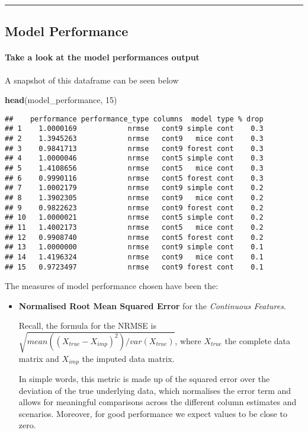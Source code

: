 \documentclass[]{article}
\newenvironment{Shaded}{\begin{snugshade}}{\end{snugshade}}
\newcommand{\DecValTok}[1]{\textcolor[rgb]{0.00,0.00,0.81}{#1}}
\newcommand{\KeywordTok}[1]{\textcolor[rgb]{0.13,0.29,0.53}{\textbf{#1}}}
\newcommand{\NormalTok}[1]{#1}
\let\oldparagraph\paragraph
\renewcommand{\paragraph}[1]{\oldparagraph{#1}\mbox{}}
\begin{document}
\begin{center}\rule{0.5\linewidth}{0.5pt}\end{center}

\hypertarget{model-performance}{%
\subsection{Model Performance}\label{model-performance}}

\hypertarget{take-a-look-at-the-model-performances-output}{%
\paragraph{Take a look at the model performances
output}\label{take-a-look-at-the-model-performances-output}}

A snapshot of this dataframe can be seen below

\begin{Shaded}
\begin{Highlighting}[]
\KeywordTok{head}\NormalTok{(model_performance, }\DecValTok{15}\NormalTok{)}
\end{Highlighting}
\end{Shaded}

\begin{verbatim}
##    performance performance_type columns  model type % drop
## 1    1.0000169            nrmse   cont9 simple cont    0.3
## 2    1.3945263            nrmse   cont9   mice cont    0.3
## 3    0.9841713            nrmse   cont9 forest cont    0.3
## 4    1.0000046            nrmse   cont5 simple cont    0.3
## 5    1.4108656            nrmse   cont5   mice cont    0.3
## 6    0.9990116            nrmse   cont5 forest cont    0.3
## 7    1.0002179            nrmse   cont9 simple cont    0.2
## 8    1.3902305            nrmse   cont9   mice cont    0.2
## 9    0.9822623            nrmse   cont9 forest cont    0.2
## 10   1.0000021            nrmse   cont5 simple cont    0.2
## 11   1.4002173            nrmse   cont5   mice cont    0.2
## 12   0.9908740            nrmse   cont5 forest cont    0.2
## 13   1.0000000            nrmse   cont9 simple cont    0.1
## 14   1.4196324            nrmse   cont9   mice cont    0.1
## 15   0.9723497            nrmse   cont9 forest cont    0.1
\end{verbatim}

The measures of model performance chosen have been the:

\begin{itemize}
\item
  \textbf{Normalised Root Mean Squared Error} for the \emph{Continuous
  Features}.

  Recall, the formula for the NRMSE is
  \(\sqrt{mean((X_{true} − X_{imp})^2)/var(X_{true})}\), where
  \(X_{true}\) the complete data matrix and \(X_{imp}\) the imputed data
  matrix.

  In simple words, this metric is made up of the squared error over the
  deviation of the true underlying data, which normalises the error term
  and allows for meaningful comparisons across the different column
  estimates and scenarios. Moreover, for good performance we expect
  values to be close to zero.
\end{itemize}
\end{document}
